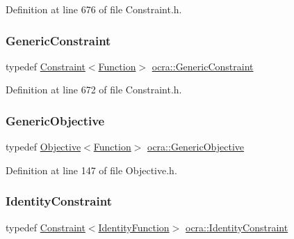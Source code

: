 Definition at line 676 of file Constraint.\+h.

\hypertarget{namespaceocra_af10341108ce661566aad00908668e2b1}{}\label{namespaceocra_af10341108ce661566aad00908668e2b1} 
\subsubsection{\texorpdfstring{Generic\+Constraint}{GenericConstraint}}
{\footnotesize\ttfamily typedef \hyperlink{classocra_1_1Constraint}{Constraint}$<$\hyperlink{classocra_1_1Function}{Function}$>$ \hyperlink{namespaceocra_af10341108ce661566aad00908668e2b1}{ocra\+::\+Generic\+Constraint}}



Definition at line 672 of file Constraint.\+h.

\hypertarget{namespaceocra_a37a91885f4fa5c523d22cb15d5673062}{}\label{namespaceocra_a37a91885f4fa5c523d22cb15d5673062} 
\subsubsection{\texorpdfstring{Generic\+Objective}{GenericObjective}}
{\footnotesize\ttfamily typedef \hyperlink{classocra_1_1Objective}{Objective}$<$\hyperlink{classocra_1_1Function}{Function}$>$ \hyperlink{namespaceocra_a37a91885f4fa5c523d22cb15d5673062}{ocra\+::\+Generic\+Objective}}



Definition at line 147 of file Objective.\+h.

\hypertarget{namespaceocra_a5fc023ff4ef8f4b0cdf410e088090731}{}\label{namespaceocra_a5fc023ff4ef8f4b0cdf410e088090731} 
\subsubsection{\texorpdfstring{Identity\+Constraint}{IdentityConstraint}}
{\footnotesize\ttfamily typedef \hyperlink{classocra_1_1Constraint}{Constraint}$<$\hyperlink{classocra_1_1IdentityFunction}{Identity\+Function}$>$ \hyperlink{namespaceocra_a5fc023ff4ef8f4b0cdf410e088090731}{ocra\+::\+Identity\+Constraint}}



